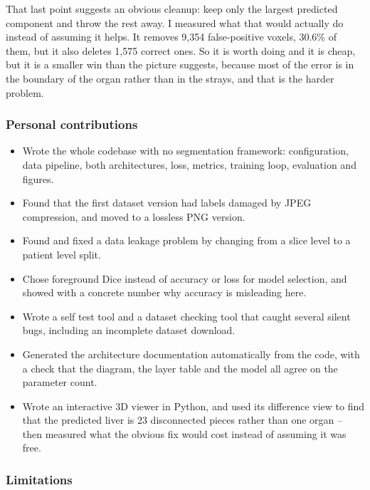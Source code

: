 \documentclass[11pt,a4paper]{article}
\begin{document}
That last point suggests an obvious cleanup: keep only the largest predicted
component and throw the rest away. I measured what that would actually do instead
of assuming it helps. It removes 9{,}354 false-positive voxels, 30.6\% of them,
but it also deletes 1{,}575 correct ones. So it is worth doing and it is cheap,
but it is a smaller win than the picture suggests, because most of the error is
in the boundary of the organ rather than in the strays, and that is the harder
problem.

\subsubsection*{Personal contributions}

\begin{itemize}
  \item Wrote the whole codebase with no segmentation framework: configuration,
        data pipeline, both architectures, loss, metrics, training loop,
        evaluation and figures.
  \item Found that the first dataset version had labels damaged by JPEG
        compression, and moved to a lossless PNG version.
  \item Found and fixed a data leakage problem by changing from a slice level to
        a patient level split.
  \item Chose foreground Dice instead of accuracy or loss for model selection,
        and showed with a concrete number why accuracy is misleading here.
  \item Wrote a self test tool and a dataset checking tool that caught several
        silent bugs, including an incomplete dataset download.
  \item Generated the architecture documentation automatically from the code, with
        a check that the diagram, the layer table and the model all agree on the
        parameter count.
  \item Wrote an interactive 3D viewer in Python, and used its difference view to
        find that the predicted liver is 23 disconnected pieces rather than one
        organ -- then measured what the obvious fix would cost instead of
        assuming it was free.
\end{itemize}

\subsubsection*{Limitations}
\end{document}

